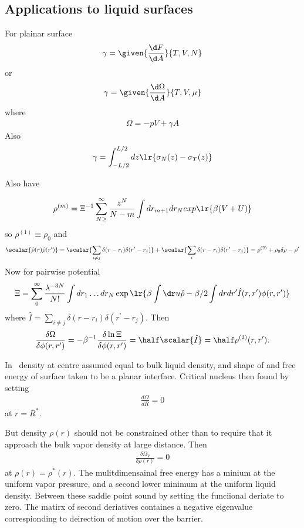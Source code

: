 {\subsection{Applications to liquid surfaces}


For plainar surface
\begin{align}
\gamma = \given{\frac{\d F}{\d A}}{T, V, N}
\end{align}
or 
\begin{align}
\gamma = \given{\frac{\d \Omega}{\d A}}{T, V, \mu}
\end{align}
where
\begin{align}
  \Omega = -pV + \gamma A
\end{align}
Also
\begin{align}
  \gamma = \int_{-L/2}^{L/2} dz \lr{\sigma_N(z) - \sigma_T(z)}
\end{align}


Also have

\begin{align}
  \rho^{(m)} = \Xi^{-1} \sum_{N\ge }^\infty \frac{z^N}{N-m} \int d r_{m+1} dr_N exp\lr{\beta(V + U)}
\end{align}
so $\rho^{(1)} \equiv \rho_0$
and 
\begin{align}
  \scalar{\hat \rho(r) \hat \rho(r^\prime)} =\scalar{\sum_{i\ne j} \delta(r-r_i) \delta(r^\prime - r_j)} + \scalar{\sum_{i} \delta(r-r_i) \delta(r^\prime - r_j)}
= \rho^{(2)} + \rho_0\delta{\rho- \rho^\prime}
\end{align}
Now for pairwise potential
\begin{align}
 \Xi = \sum_0 ^\infty \frac{\lambda^{-3N}}{N!} \int dr_1 \ldots d r_N \exp\lr{\beta \int \dr u \hat \rho - \beta/2 \int dr dr^\prime \hat I (r,r^\prime)\phi(r,r^\prime)}
\end{align}
where $\hat I = \sum_{i\ne j} \delta(r - r_i)\delta(r^\prime - r_j)$.
Then
\begin{align}
  \frac{\delta \Omega}{\delta \phi(r,r^\prime)} = -\beta^{-1} \frac{\delta \ln \Xi}{\delta \phi(r, r^\prime)} = \half \scalar{\hat I} = \half \rho^{(2)}(r,r^\prime).
\end{align}


In \cnt\ density at centre assumed equal to bulk liquid density, 
and shape of and free energy of surface taken to be a planar interface.
Critical nucleus then found by setting 
\begin{align}
\frac{d \Omega}{d R} =0
\end{align}
at $r = R^\ast$.

But density $\rho(r)$ should not be constrained other than to require that it approach the bulk vapor density at large distance.
Then 
\begin{align}
\frac{\delta \Omega_V}{\delta \rho(r)} = 0
\end{align}
at $\rho(r) = \rho^\ast(r)$.
The mulitdimensainal free energy has a minium at the uniform vapor pressure,
and a second lower minimum at the  uniform liquid density. Between these saddle point sound by setting the funciional deriate to zero.
The matirx of second deriatives containes a negative eigenvalue correspionding to deirection of motion over the barrier.

}
